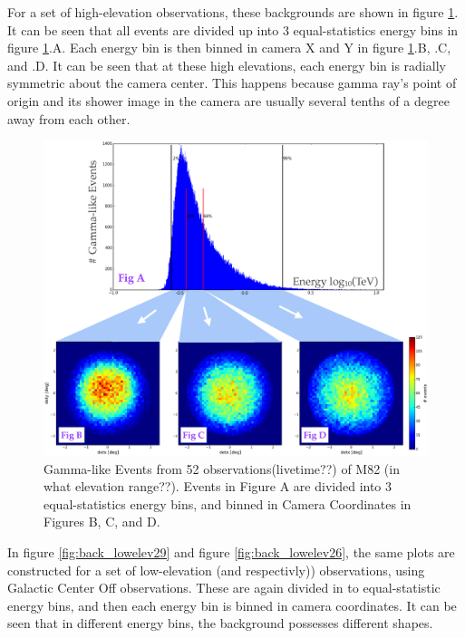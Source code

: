 For a set of high-elevation observations, these backgrounds are shown in figure \ref{fig:back_highelev}.
It can be seen that all events are divided up into 3 equal-statistics energy bins in figure \ref{fig:back_highelev}.A.
Each energy bin is then binned in camera X and Y in figure \ref{fig:back_highelev}.B, .C, and .D.
It can be seen that at these high elevations, each energy bin is radially symmetric about the camera center.
This happens because gamma ray's point of origin and its shower image in the camera are usually several tenths of a degree away from each other.

\begin{figure}[ht]
  \begin{center}
    \includegraphics[width=\textwidth]{images/ctools/backgrounds_highelev.eps}
    \caption[FITS Background at High Elevations]{Gamma-like Events from 52 observations(livetime??) of M82 (in what elevation range??).  Events in Figure A are divided into 3 equal-statistics energy bins, and binned in Camera Coordinates in Figures B, C, and D.}\label{fig:back_highelev}
  \end{center}
\end{figure}


In figure \ref{fig:back_lowelev29} and figure \ref{fig:back_lowelev26}, the same plots are constructed for a set of low-elevation (\degree and \degree respectivly)) observations, using Galactic Center Off observations.
These are again divided in to equal-statistic energy bins, and then each energy bin is binned in camera coordinates.
It can be seen that in different energy bins, the background possesses different shapes.

